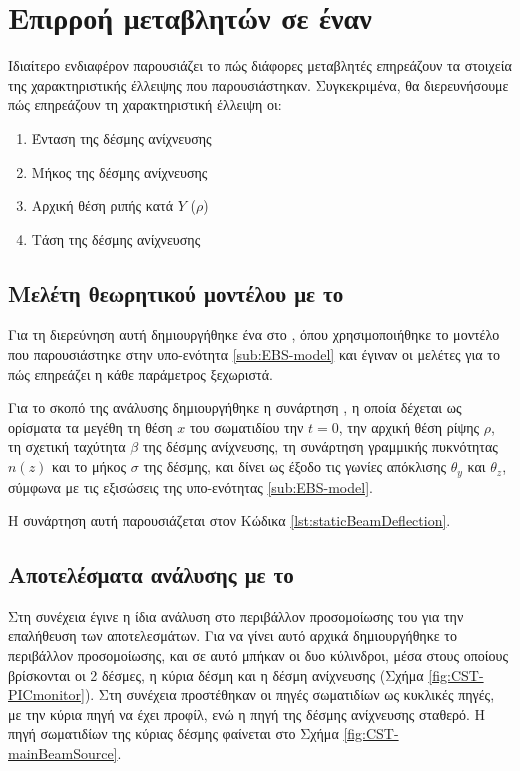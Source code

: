 \section{Επιρροή μεταβλητών σε έναν }

Ιδιαίτερο ενδιαφέρον παρουσιάζει το πώς διάφορες μεταβλητές επηρεάζουν τα στοιχεία της χαρακτηριστικής έλλειψης που παρουσιάστηκαν.
Συγκεκριμένα, θα διερευνήσουμε πώς επηρεάζουν τη χαρακτηριστική έλλειψη οι:
\begin{enumerate}
	\item Ένταση της δέσμης ανίχνευσης
	\item Μήκος της δέσμης ανίχνευσης
	\item Αρχική θέση ριπής κατά $Y$ ($\rho$) 
	\item Τάση της δέσμης ανίχνευσης
\end{enumerate}

\subsection{Μελέτη θεωρητικού μοντέλου με το } \label{sub:variable-analysis-MATLAB}
Για τη διερεύνηση αυτή δημιουργήθηκε ένα  στο , όπου χρησιμοποιήθηκε το μοντέλο που παρουσιάστηκε στην υπο-ενότητα \ref{sub:EBS-model} και έγιναν οι μελέτες για το πώς επηρεάζει η κάθε παράμετρος ξεχωριστά. 

Για το σκοπό της ανάλυσης δημιουργήθηκε η συνάρτηση , η οποία δέχεται ως ορίσματα τα μεγέθη τη θέση $x$ του σωματιδίου την $t = 0$, την αρχική θέση ρίψης $\rho$, τη σχετική ταχύτητα $\beta$ της δέσμης ανίχνευσης, τη συνάρτηση γραμμικής πυκνότητας$n(z)$ και το μήκος $\sigma$ της δέσμης, και δίνει ως έξοδο τις γωνίες απόκλισης $\theta_y$ και $\theta_z$, σύμφωνα με τις εξισώσεις της υπο-ενότητας \ref{sub:EBS-model}.

Η συνάρτηση αυτή παρουσιάζεται στον Κώδικα \ref{lst:staticBeamDeflection}.



\subsection{Αποτελέσματα ανάλυσης με το }

Στη συνέχεια έγινε η ίδια ανάλυση στο περιβάλλον προσομοίωσης του  για την επαλήθευση των αποτελεσμάτων. 
Για να γίνει αυτό αρχικά δημιουργήθηκε το περιβάλλον προσομοίωσης, και σε αυτό μπήκαν οι  δυο κύλινδροι, μέσα στους οποίους βρίσκονται οι 2 δέσμες, η κύρια δέσμη και η δέσμη ανίχνευσης (Σχήμα \ref{fig:CST-PICmonitor}). 
Στη συνέχεια προστέθηκαν οι πηγές σωματιδίων ως κυκλικές πηγές, με την κύρια πηγή να έχει  προφίλ, ενώ η πηγή της δέσμης ανίχνευσης σταθερό. 
Η πηγή σωματιδίων της κύριας δέσμης φαίνεται στο Σχήμα \ref{fig:CST-mainBeamSource}.

